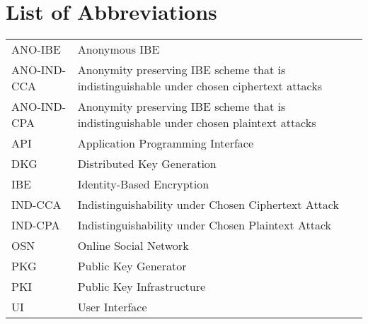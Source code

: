 \documentclass[master=eelt,masteroption=em]{kulemt}
\theoremstyle{plain}
\theoremstyle{definition}
\begin{document}
\listoffigures
\listoftables
\chapter{List of Abbreviations}
\begin{flushleft}
  \renewcommand{\arraystretch}{1.1}
  \begin{tabularx}{\textwidth}{@{}p{30mm}X@{}}
    ANO-IBE & Anonymous IBE \\
    ANO-IND-CCA & Anonymity preserving IBE scheme that is indistinguishable under chosen ciphertext attacks \\ 
    ANO-IND-CPA & Anonymity preserving IBE scheme that is indistinguishable under chosen plaintext attacks \\
    API & Application Programming Interface \\
    DKG   & Distributed Key Generation \\
    IBE   & Identity-Based Encryption \\
    IND-CCA & Indistinguishability under Chosen Ciphertext Attack \\
    IND-CPA  & Indistinguishability under Chosen Plaintext Attack  \\
    OSN & Online Social Network \\
    PKG   & Public Key Generator \\
    PKI & Public Key Infrastructure \\
    UI & User Interface \\
  \end{tabularx}
\end{flushleft}
\end{document}
